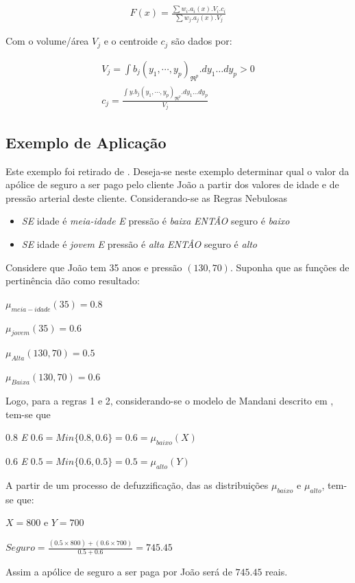 \begin{eqnarray}
F(x) = \frac{\sum w_i.a_i(x).V_i.c_i}{\sum w_j.a_j(x).V_j}
\end{eqnarray}

Com o volume/área $V_j$ e o centroide $c_j$ são dados por:

\begin{eqnarray}
V_j = \int{b_j(y_1,\cdots,y_p)}_{\Re^{p}}.dy_1\dots dy_p > 0\\
c_j = \frac{\int{y.b_j(y_1,\cdots,y_p)}_{\Re^{p}}.dy_1\dots dy_p}{V_j}
\end{eqnarray}

\subsection{Exemplo de Aplicação}

Este exemplo foi retirado de \cite{passos2005datamining}. Deseja-se neste
exemplo determinar qual o valor da apólice de seguro a ser pago pelo
cliente João a partir dos valores de idade e de pressão arterial deste cliente.
Considerando-se as Regras Nebulosas
\begin{itemize}
  \item \emph{SE} idade é \textit{meia-idade} \emph{E} pressão é \textit{baixa} \emph{ENTÂO} seguro é \textit{baixo}
  \item \emph{SE} idade é \textit{jovem} \emph{E} pressão é \textit{alta} \emph{ENTÂO} seguro é \textit{alto}
\end{itemize}

Considere que João tem 35 anos e pressão $(130,70)$. Suponha que as funções de pertinência dão como resultado:
\begin{description}
  \item $\mu_{meia-idade} (35) = 0.8$
  \item $\mu_{jovem} (35) = 0.6$
  \item $\mu_{Alta}(130,70) = 0.5$
  \item $\mu_{Baixa}(130,70) = 0.6$
\end{description}

Logo, para a regras 1 e 2, considerando-se o modelo de Mandani descrito em \cite{passos2005datamining}, tem-se que 
\begin{description}
  \item $0.8$ \emph{E} $0.6 = Min \lbrace 0.8,0.6 \rbrace = 0.6 = \mu_{baixo}(X)$ 
  \item $0.6$ \emph{E} $0.5 = Min \lbrace 0.6,0.5 \rbrace = 0.5 = \mu_{alto}(Y)$
\end{description}

A partir de um processo de defuzzificação, das as distribuições $\mu_{baixo}$
e $\mu_{alto}$, tem-se que:

\begin{description}
  \item $X = 800$ e $Y=700$
  \item $Seguro = \frac{(0.5 \times 800)+(0.6 \times 700)}{0.5 + 0.6} = 745.45$
\end{description}

Assim a apólice de seguro a ser paga por João será de $745.45$ reais.

